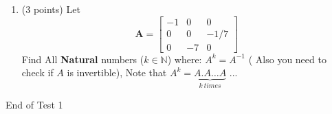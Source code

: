 \documentclass[]{exam}
\begin{document}
\begin{enumerate}
\item (3 points) Let \begin{equation}
    \mathbf{A}=\begin{bmatrix}
       -1  & 0 & 0 \\
       0  & 0 & -1/7 \\
       0  & -7 & 0 
    \end{bmatrix}
    \end{equation}
Find All \textbf{Natural} numbers ($k\in \mathbb{N}$) where: $A^k=A^{-1}$ ( Also you need to check if $A$ is invertible), Note that $A^k=\underbrace{A.A \dots A}_{k \ times} $
...
\end{enumerate}

\begin{center}
    End of Test 1
\end{center}


\newpage 













\end{document}
